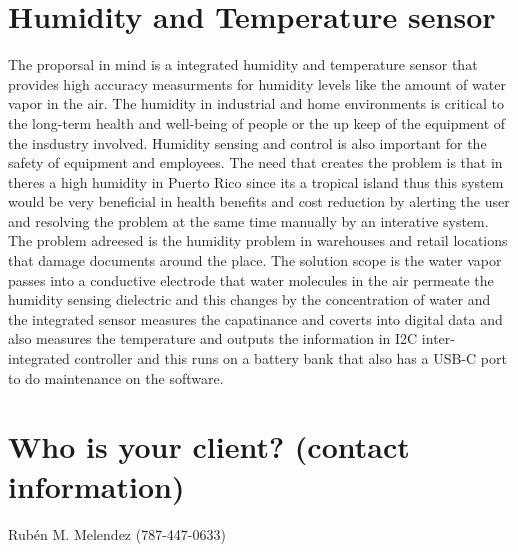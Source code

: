 \section {Humidity and Temperature sensor}

The proporsal in mind is a integrated humidity and temperature sensor that provides high accuracy measurments for humidity levels like the amount of water vapor in the air. The humidity in industrial and home environments is critical to the long-term health and well-being of people or the up keep of the equipment of the insdustry involved. Humidity sensing and control is also important for the safety of equipment and employees. The need that creates the problem is that in theres a high humidity in Puerto Rico since its a tropical island thus this system would be very beneficial in health benefits and cost reduction by alerting the user and resolving the problem at the same time manually by an interative system. The problem adreesed is the humidity problem in warehouses and retail locations that damage documents around the place. The solution scope is the water vapor passes into a conductive electrode that water molecules in the air permeate the humidity sensing dielectric and this changes by the concentration of water and the integrated sensor measures the capatinance and coverts into digital data and also measures the temperature and outputs the information in I2C inter-integrated controller and this runs on a battery bank that also has a USB-C port to do maintenance on the software.  

\newpage
\section {Who is your client? (contact information)}
Rubén M. Melendez (787-447-0633)
